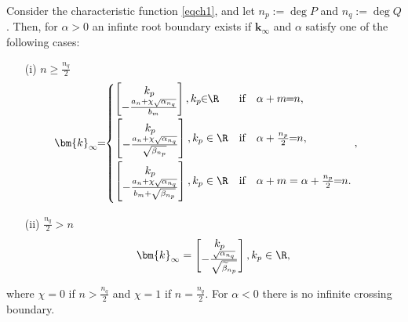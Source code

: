 \documentclass[twoside,reqno,11pt]{fcaa-var} %
\begin{document}
\begin{proposition} \label{prop:IRB}
	Consider the characteristic function \eqref{eqch1}, and let
	$n_{p}:=\deg P$ and $n_q:=\deg Q$. Then, for $\alpha>0$ an infinte root boundary exists if $\bm{k}_\infty$ and $\alpha$ satisfy one of the following cases: %
	\begin{itemize}
		\item[(i)] $n\geq\frac{n_q}{2}$ 
		\begin{equation}
		\!\!\!\!\!\!\!\!\bm{k}_\infty\!\!=\!\!\begin{cases} \begin{bmatrix} k_p \\ -\tfrac{a_n+\chi\sqrt{\alpha_{n_q}}}{b_m} \end{bmatrix} \vspace{1mm}, k_p\!\!\in\!\!\R & \text{if}\quad \alpha+m\!\!=\!\!n, \\ \vspace{1mm}
		\begin{bmatrix} k_p \\ -\tfrac{a_n+\chi\sqrt{\alpha_{n_q}}}{\sqrt{\beta_{n_p}}} \end{bmatrix}, k_p\in\R & \text{if}\quad \alpha+\tfrac{n_p}{2}\!\!=\!\!n, \\ \vspace{1mm}
		\begin{bmatrix} k_p \\ -\tfrac{a_n+\chi\sqrt{\alpha_{n_q}}}{b_m+\sqrt{\beta_{n_p}}} \end{bmatrix}, k_p\in\R & \text{if}\quad \alpha+m=\alpha+\tfrac{n_p}{2}\!\!=\!\!n.
		\end{cases}, \label{eqIRBa}
		\end{equation}
		\item[(ii)] $\frac{n_q}{2}>n$ %
		\begin{equation}
		\bm{k}_\infty=\begin{bmatrix} k_p \\ -\tfrac{\sqrt{\alpha_{n_q}}}{\sqrt{\widetilde{\beta}_{n_p}}} \end{bmatrix}, k_p\in\R, \label{eqIRBb}
		\end{equation}
	\end{itemize}%
	where $\chi=0$ if $n>\frac{n_q}{2}$ and $\chi=1$ if $n=\frac{n_q}{2}$. For $\alpha<0$ there is no infinite crossing boundary.
\end{proposition}
\end{document}
